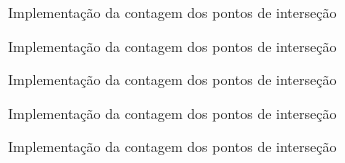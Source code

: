 \begin{frame}[fragile]{Implementação da contagem dos pontos de interseção}
\end{frame}

\begin{frame}[fragile]{Implementação da contagem dos pontos de interseção}
\end{frame}

\begin{frame}[fragile]{Implementação da contagem dos pontos de interseção}
\end{frame}

\begin{frame}[fragile]{Implementação da contagem dos pontos de interseção}
\end{frame}

\begin{frame}[fragile]{Implementação da contagem dos pontos de interseção}
\end{frame}
